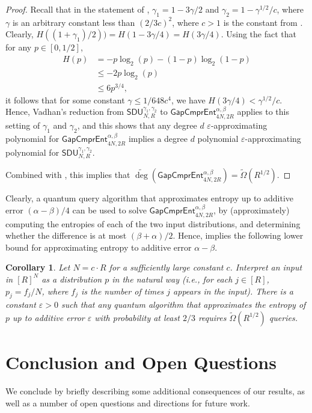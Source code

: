 \documentclass[11pt, letterpaper, fleqn]{article}
\newtheorem{corollary}[theorem]{Corollary}
\theoremstyle{plain}
\newcommand{\SDU}{\mathsf{ SDU}}
\newcommand{\eps}{\varepsilon}
\newcommand{\adeg}{\widetilde{\operatorname{deg}}}
\begin{document}
\begin{proof}
Recall that in the statement of , $\gamma_1 = 1-3\gamma/2$ and $\gamma_2=1-\gamma^{1/2}/c$,
where $\gamma$ is an arbitrary constant less than $(2/3c)^2$, where $c>1$
is the constant from .
Clearly, 
$H( (1+\gamma_1)/2)) = H(1-3 \gamma/4) = H(3 \gamma/4)$.
Using the fact that for any $p \in [0, 1/2]$,
\begin{align*}
H(p) &= -p \log_2(p) - (1-p) \log_2(1-p) \\
&\le -2p\log_2(p) \\
&\le 6p^{3/4},
\end{align*}
it follows that for some constant $\gamma \le 1/648c^4$, we have $H(3 \gamma/4) < \gamma^{1/2}/c$.
Hence, Vadhan's reduction from $\SDU_{N, R}^{\gamma_1, \gamma_2}$ to $\mathsf{GapCmprEnt}^{\alpha, \beta}_{4N, 2R}$ applies to this setting
of $\gamma_1$ and $\gamma_2$, and this shows
that any degree $d$ $\eps$-approximating polynomial for $\mathsf{GapCmprEnt}^{\alpha, \beta}_{4N, 2R}$ implies a degree $d$ polynomial $\eps$-approximating
polynomial for  $\SDU_{N, R}^{\gamma_1, \gamma_2}$.

Combined with , this implies that
$\adeg(\mathsf{GapCmprEnt}^{\alpha, \beta}_{4N, 2R}) = \tilde{\Omega}(R^{1/2}).$
\end{proof}

Clearly, a quantum query algorithm
that approximates entropy
up to additive error $(\alpha-\beta)/4$ can be used to solve $\mathsf{GapCmprEnt}^{\alpha, \beta}_{4N, 2R}$, by (approximately) computing the entropies of each of the two input distributions, and determining whether the difference is at most $(\beta + \alpha)/2$. Hence,  implies the following
lower bound for approximating entropy to additive error $\alpha-\beta$. 



\begin{corollary}
Let $N=c \cdot R$ for a sufficiently large constant $c$. 
Interpret an input in $[R]^N$ as a distribution $p$ 
in the natural way (i.e., for each $j \in [R]$, $p_j=f_j/N$, where $f_j$
is the number of times $j$ appears in the input). 
There is a constant $\eps > 0$ such that any quantum algorithm
that approximates the entropy of $p$ up to additive error $\eps$
with probability at least $2/3$
requires $\tilde{\Omega}(R^{1/2})$ queries.
\end{corollary}


 
\section{Conclusion and Open Questions}
\label{s:conclusion}
We conclude by briefly describing some additional consequences of our results,
as well as a number of open questions and directions for future work.
\end{document}
